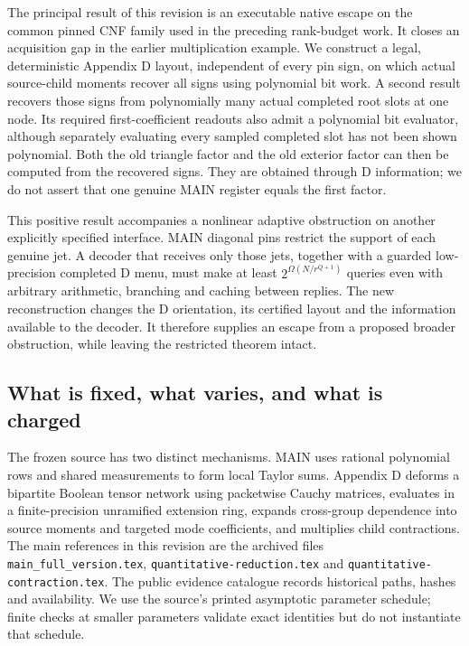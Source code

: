 \documentclass[11pt,a4paper]{article}
\begin{document}
The principal result of this revision is an executable native escape on
the common pinned CNF family used in the preceding rank-budget work. It
closes an acquisition gap in the earlier multiplication example. We
construct a legal, deterministic Appendix D layout, independent of every
pin sign, on which actual source-child moments recover all signs using
polynomial bit work. A second result recovers those signs from
polynomially many actual completed root slots at one node. Its required
first-coefficient readouts also admit a polynomial bit evaluator,
although separately evaluating every sampled completed slot has not been
shown polynomial. Both the old triangle factor and the old exterior
factor can then be computed from the recovered signs. They are obtained
through D information; we do not assert that one genuine MAIN register
equals the first factor.

This positive result accompanies a nonlinear adaptive obstruction on
another explicitly specified interface. MAIN diagonal pins restrict the
support of each genuine jet. A decoder that receives only those jets,
together with a guarded low-precision completed D menu, must make at
least \(2^{\Omega(N/r^{Q+1})}\) queries even with arbitrary arithmetic,
branching and caching between replies. The new reconstruction changes
the D orientation, its certified layout and the information available to
the decoder. It therefore supplies an escape from a proposed broader
obstruction, while leaving the restricted theorem intact.

\subsection{What is fixed, what varies, and what is
charged}\label{v9-what-is-fixed-what-varies-and-what-is-charged}

The frozen source has two distinct mechanisms. MAIN uses rational
polynomial rows and shared measurements to form local Taylor sums.
Appendix D deforms a bipartite Boolean tensor network using packetwise
Cauchy matrices, evaluates in a finite-precision unramified extension
ring, expands cross-group dependence into source moments and targeted
mode coefficients, and multiplies child contractions. The main
references in this revision are the archived files
\nolinkurl{main_full_version.tex},
\nolinkurl{quantitative-reduction.tex} and
\nolinkurl{quantitative-contraction.tex}. The public evidence catalogue
records historical paths, hashes and availability. We use the source's
printed asymptotic parameter schedule; finite checks at smaller
parameters validate exact identities but do not instantiate that
schedule.
\end{document}
